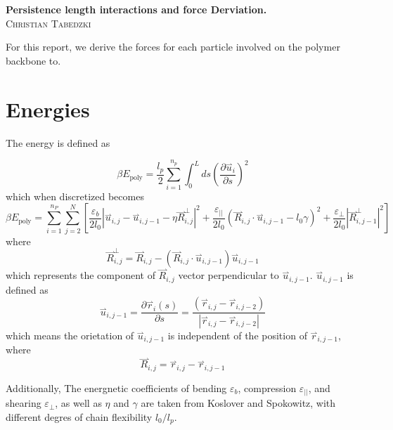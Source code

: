 \documentclass{article}
\renewcommand{\ij}{_{i,j}}
\newcommand{\ijj}{_{i,j-1}}
\newcommand{\ijk}{_{i,j-2}}
\newcommand{\magn}[1]{\left\vert #1 \right\vert }
\renewcommand{\part}[2]{\frac{\partial #1 }{\partial #2}}
\newcommand{\harp}{\overset{\rightharpoonup}}
\begin{document}
\begin{center}
  \textbf{Persistence length interactions and force Derviation.}\\
  \textsc{Christian Tabedzki}
\end{center} 



For this report, we derive the forces for each particle involved on the polymer backbone to.

\section{Energies}

The energy is defined as 

\begin{equation}
  \label{eqn:Energy_polymer}
  \beta E_{\text{poly}}  =  \frac{l_p}{2} \sum_{i=1}^{n_p} \int_0^L ds \left(\part{\harp u_i}{s}\right)^2
\end{equation}
which when discretized becomes
\begin{equation}
  \label{eqn:Energy_polymer_discrete}
  \beta E_{\text{poly}}  =  \sum_{i=1}^{n_P}  \sum_{j=2}^{N} \left[
  \frac{\varepsilon_b}{2 l_0}  \magn{ \harp u \ij - \harp u \ijj - \eta \harp R\ij ^\bot} ^2 +
   \frac{\varepsilon_{\vert \vert}}{2 l_0} 
   \left( \harp R\ij \cdot \harp u \ijj - l_0 \gamma \right)^2 +
   \frac{\varepsilon _\perp}
   {2l_0} \magn{\harp R\ijj ^\perp}^2
  \right]
\end{equation}
where 
\[
\harp  R\ij  ^\bot = \harp R \ij - \left(\harp R \ij \cdot \harp u \ijj \right) \harp u \ijj 
\]
which represents the component of \(\harp R \ij\) vector perpendicular to \(\harp u \ijj \).
\(\harp u \ijj \) is defined as  
  \[\harp u_{i,j-1} = 
  \part{\harp{r}_i(s)}{s} = 
    \frac{\left( \harp r\ij-\harp r\ijk \right)}{\magn{\harp r\ij - \harp r\ijk}} \]
which means the orietation of \(\harp u_{i,j-1}\) is independent of the position of \(\harp r\ijj\), where 
\[\harp R \ij = \harp r \ij - \harp r \ijj \]

Additionally, The energnetic coefficients of bending $\varepsilon_b$,
compression $\varepsilon_{\vert \vert}$, and shearing $\varepsilon_\perp$, as
well as $\eta$ and $\gamma$ are taken from Koslover and Spokowitz, with
different degres of chain flexibility \(l_0/l_p\).
\end{document}

